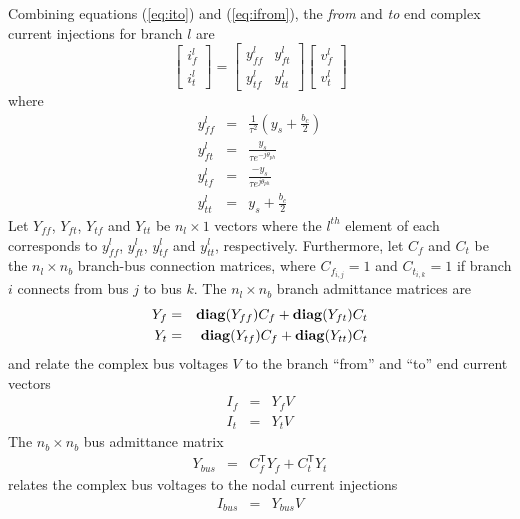 Combining equations (\ref{eq:ito}) and (\ref{eq:ifrom}), the \textit{from}
and \textit{to} end complex current injections for branch $l$ are
\begin{equation}
\label{eq:ybranch}
\begin{bmatrix}
i_f^l\\
i_t^l
\end{bmatrix}
=
\begin{bmatrix}
y_{ff}^l& y_{ft}^l\\
y_{tf}^l& y_{tt}^l
\end{bmatrix}
\begin{bmatrix}
v_f^l\\
v_t^l
\end{bmatrix}
\end{equation}
where
\begin{eqnarray}
\label{eq:yff}
y_{ff}^l& =& \frac{1}{\tau^2} \left(y_s + \frac{b_c}{2}\right)\\
\label{eq:yft}
y_{ft}^l& =& \frac{y_s}{\tau e^{-j\theta_{ph}}}\\
\label{eq:ytf}
y_{tf}^l& =& \frac{-y_s}{\tau e^{j\theta_{ph}}}\\
\label{eq:ytt}
y_{tt}^l& =& y_s + \frac{b_c}{2}
\end{eqnarray}
Let $Y_{ff}$, $Y_{ft}$, $Y_{tf}$ and $Y_{tt}$ be $n_l \times 1$ vectors where
the $l^{th}$ element of each corresponds to $y_{ff}^l$, $y_{ft}^l$,
$y_{tf}^l$ and $y_{tt}^l$, respectively.  Furthermore, let $C_f$ and $C_t$ be the
$n_l \times n_b$ branch-bus connection matrices, where $C_{f_{i,j}} = 1$ and
$C_{t_{i,k}} = 1$ if branch $i$ connects from bus $j$ to bus $k$.  The $n_l
\times n_b$ branch admittance matrices are
\begin{eqnarray}
Y_f& =& \mathop{\mathbf{diag}}(Y_{ff})C_f + \mathop{\mathbf{diag}}(Y_{ft})C_t\\
Y_t& =& \mathop{\mathbf{diag}}(Y_{tf})C_f + \mathop{\mathbf{diag}}(Y_{tt})C_t
\end{eqnarray}
and relate the complex bus voltages $V$ to the branch ``from'' and
``to'' end current vectors
\begin{eqnarray}
I_{f}& =& Y_{f}V\\
I_{t}& =& Y_{t}V
\end{eqnarray}
The $n_b \times n_b$ bus admittance matrix
\begin{eqnarray}
Y_{bus}& =& C_f^\mathsf{T} Y_f + C_t^\mathsf{T} Y_t
\end{eqnarray}
relates the complex bus voltages to the nodal current injections
\begin{eqnarray}
I_{bus}& =& Y_{bus}V
\end{eqnarray}
